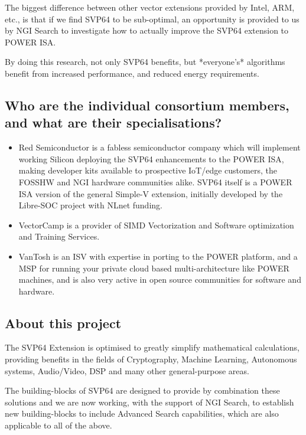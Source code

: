 The biggest difference between other vector extensions provided by Intel,
ARM, etc., is that if we find \acrshort{SVP64} to be sub-optimal, an opportunity is
provided to us by \acrshort{NGI} Search to investigate how to actually improve the
\acrshort{SVP64} extension to \acrshort{POWER} ISA.

By doing this research, not only \acrshort{SVP64} benefits, but *everyone's* algorithms
benefit from increased performance, and reduced energy requirements.

\subsection{Who are the individual consortium members, and what are their specialisations?}

\begin{itemize}
  \item Red Semiconductor is a fabless semiconductor company which will implement
  working Silicon deploying the \acrshort{SVP64} enhancements to the \acrshort{POWER} ISA, making
  developer kits available to prospective \acrfull{IoT}/edge customers, the
  \acrfull{FOSSHW} and NGI hardware communities
  alike. \acrshort{SVP64} itself is a \acrshort{POWER} ISA version of the general Simple-V
  extension, initially developed by the Libre-SOC project with NLnet funding.
  \item VectorCamp is a provider of \acrfull{SIMD} Vectorization and Software optimization
  and Training Services.
  \item VanTosh is an \acrfull{ISV} with expertise in porting
  to the \acrshort{POWER} platform, and a \acrfull{MSP} for running
  your private cloud based multi-architecture like \acrshort{POWER} machines, and is
  also very active in open source communities for software and hardware.
\end{itemize}

\subsection{About this project}

The \acrshort{SVP64} Extension is optimised to greatly simplify mathematical calculations,
providing benefits in the fields of Cryptography, Machine Learning,
Autonomous systems, Audio/Video, \acrfull{DSP} and many other general-purpose areas.
 
The building-blocks of \acrshort{SVP64} are designed to provide by combination these
solutions and we are now working, with the support of \acrshort{NGI} Search, to
establish new building-blocks to include Advanced Search capabilities,
which are also applicable to all of the above.

